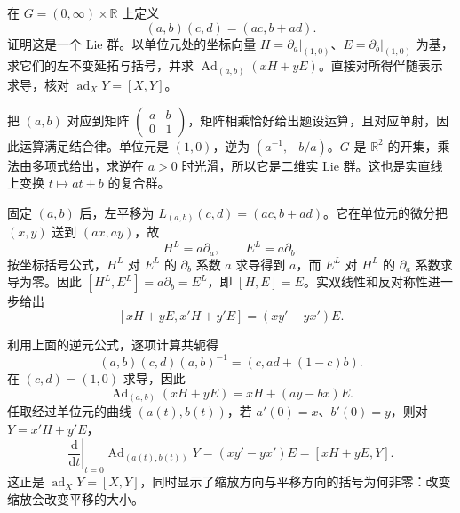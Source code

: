 \BookExercises

\begin{exercise}\label{g1:ex:affine-group-lie-data}
	在 \(G=(0,\infty)\times\mathbb R\) 上定义
	\[
		(a,b)(c,d)=(ac,b+ad).
	\]
	证明这是一个 Lie 群。以单位元处的坐标向量 \(H=\partial_a|_{(1,0)}\)、\(E=\partial_b|_{(1,0)}\) 为基，求它们的左不变延拓与括号，并求 \(\operatorname{Ad}_{(a,b)}(xH+yE)\)。直接对所得伴随表示求导，核对 \(\operatorname{ad}_XY=[X,Y]\)。
\end{exercise}
\begin{solution}
	把 \((a,b)\) 对应到矩阵 \(\begin{pmatrix}a&b\\0&1\end{pmatrix}\)，矩阵相乘恰好给出题设运算，且对应单射，因此运算满足结合律。单位元是 \((1,0)\)，逆为 \((a^{-1},-b/a)\)。\(G\) 是 \(\mathbb R^2\) 的开集，乘法由多项式给出，求逆在 \(a>0\) 时光滑，所以它是二维实 Lie 群。这也是实直线上变换 \(t\mapsto at+b\) 的复合群。

	固定 \((a,b)\) 后，左平移为 \(L_{(a,b)}(c,d)=(ac,b+ad)\)。它在单位元的微分把 \((x,y)\) 送到 \((ax,ay)\)，故
	\[
		H^L=a\partial_a,\qquad E^L=a\partial_b.
	\]
	按坐标括号公式，\(H^L\) 对 \(E^L\) 的 \(\partial_b\) 系数 \(a\) 求导得到 \(a\)，而 \(E^L\) 对 \(H^L\) 的 \(\partial_a\) 系数求导为零。因此 \([H^L,E^L]=a\partial_b=E^L\)，即 \([H,E]=E\)。实双线性和反对称性进一步给出
	\[
		[xH+yE,x'H+y'E]=(xy'-yx')E.
	\]

	利用上面的逆元公式，逐项计算共轭得
	\[
		(a,b)(c,d)(a,b)^{-1}=(c,ad+(1-c)b).
	\]
	在 \((c,d)=(1,0)\) 求导，因此
	\[
		\operatorname{Ad}_{(a,b)}(xH+yE)=xH+(ay-bx)E.
	\]
	任取经过单位元的曲线 \((a(t),b(t))\)，若 \(a'(0)=x\)、\(b'(0)=y\)，则对 \(Y=x'H+y'E\)，
	\[
		\left.\frac{\mathrm{d}}{\mathrm{d}t}\right|_{t=0}\operatorname{Ad}_{(a(t),b(t))}Y
		=(xy'-yx')E=[xH+yE,Y].
	\]
	这正是 \(\operatorname{ad}_XY=[X,Y]\)，同时显示了缩放方向与平移方向的括号为何非零：改变缩放会改变平移的大小。
\end{solution}

